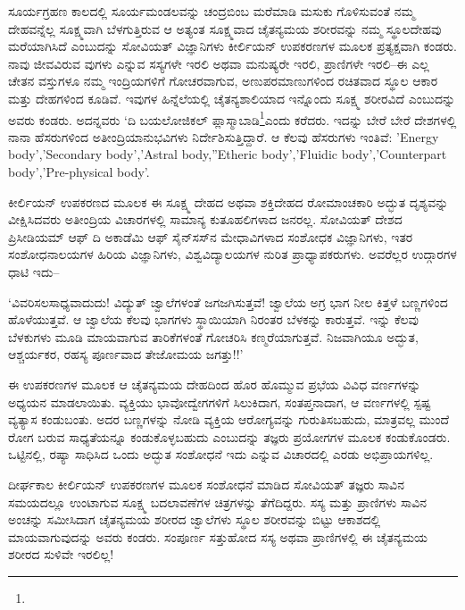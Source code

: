 ಸೂರ್ಯಗ್ರಹಣ ಕಾಲದಲ್ಲಿ ಸೂರ್ಯಮಂಡಲವನ್ನು ಚಂದ್ರಬಿಂಬ ಮರೆಮಾಡಿ ಮಸುಕು ಗೊಳಿಸುವಂತೆ ನಮ್ಮ ದೇಹವನ್ನೆಲ್ಲ ಸೂಕ್ಷ್ಮವಾಗಿ ಬೆಳಗುತ್ತಿರುವ ಆ ಅತ್ಯಂತ ಸೂಕ್ಷ್ಮವಾದ ಚೈತನ್ಯಮಯ ಶರೀರವನ್ನು ನಮ್ಮ ಸ್ಥೂಲದೇಹವು ಮರೆಯಾಗಿಸಿದೆ ಎಂಬುದನ್ನು ಸೋವಿಯತ್ ವಿಜ್ಞಾನಿಗಳು ಕೀರ್ಲಿಯನ್ ಉಪಕರಣಗಳ ಮೂಲಕ ಪ್ರತ್ಯಕ್ಷವಾಗಿ ಕಂಡರು. ನಾವು ಜೀವವಿರುವ ವುಗಳು ಎನ್ನುವ ಸಸ್ಯಗಳೇ ಇರಲಿ ಅಥವಾ ಮನುಷ್ಯರೇ ಇರಲಿ, ಪ್ರಾಣಿಗಳೇ ಇರಲಿ–ಈ ಎಲ್ಲ ಚೇತನ ವಸ್ತುಗಳೂ ನಮ್ಮ ಇಂದ್ರಿಯಗಳಿಗೆ ಗೋಚರವಾಗುವ, ಅಣುಪರಮಾಣುಗಳಿಂದ ರಚಿತವಾದ ಸ್ಥೂಲ ಆಕಾರ ಮತ್ತು ದೇಹಗಳಿಂದ ಕೂಡಿವೆ. ಇವುಗಳ ಹಿನ್ನೆಲೆಯಲ್ಲಿ ಚೈತನ್ಯಶಾಲಿಯಾದ ಇನ್ನೊಂದು ಸೂಕ್ಷ್ಮ ಶರೀರವಿದೆ ಎಂಬುದನ್ನು ಅವರು ಕಂಡರು. ಅದನ್ನವರು ‘ದಿ ಬಯಲೋಜಿಕಲ್ ಪ್ಲಾಸ್ಮಾಬಾಡಿ\footnote{}ಎಂದು ಕರೆದರು. ಇದನ್ನು ಬೇರೆ ಬೇರೆ ದೇಶಗಳಲ್ಲಿ ನಾನಾ ಹೆಸರುಗಳಿಂದ ಅತೀಂದ್ರಿಯಾನುಭವಿಗಳು ನಿರ್ದೇಶಿಸುತ್ತಿದ್ದಾರೆ. ಆ ಕೆಲವು ಹೆಸರುಗಳು ಇಂತಿವೆ: 'Energy body','Secondary body','Astral body,''Etheric body','Fluidic body','Counterpart body','Pre-physical body'.

ಕೀರ್ಲಿಯನ್ ಉಪಕರಣದ ಮೂಲಕ ಈ ಸೂಕ್ಷ್ಮ ದೇಹದ ಅಥವಾ ಶಕ್ತಿದೇಹದ ರೋಮಾಂಚಕಾರಿ ಅದ್ಭುತ ದೃಶ್ಯವನ್ನು ವೀಕ್ಷಿಸಿದವರು ಅತೀಂದ್ರಿಯ ವಿಚಾರಗಳಲ್ಲಿ ಸಾಮಾನ್ಯ ಕುತೂಹಲಿಗಳಾದ ಜನರಲ್ಲ. ಸೋವಿಯತ್ ದೇಶದ ಪ್ರಿಸೀಡಿಯಮ್ ಆಫ್ ದಿ ಅಕಾಡೆಮಿ ಆಫ್ ಸೈನ್​ಸಸ್​ನ ಮೇಧಾವಿಗಳಾದ ಸಂಶೋಧಕ ವಿಜ್ಞಾನಿಗಳು, ಇತರ ಸಂಶೋಧನಾಲಯಗಳ ಹಿರಿಯ ವಿಜ್ಞಾನಿಗಳು, ವಿಶ್ವವಿದ್ಯಾಲಯಗಳ ನುರಿತ ಪ್ರಾಧ್ಯಾಪಕರುಗಳು. ಅವರೆಲ್ಲರ ಉದ್ಗಾರಗಳ ಧಾಟಿ ಇದು–

‘ವಿವರಿಸಲಸಾಧ್ಯವಾದುದು! ವಿದ್ಯುತ್ ಜ್ವಾಲೆಗಳಂತೆ ಜಗಜಗಿಸುತ್ತವೆ! ಜ್ವಾಲೆಯ ಅಗ್ರ ಭಾಗ ನೀಲ ಕಿತ್ತಳೆ ಬಣ್ಣಗಳಿಂದ ಹೊಳೆಯುತ್ತವೆ. ಆ ಜ್ವಾಲೆಯ ಕೆಲವು ಭಾಗಗಳು ಸ್ಥಾಯಿಯಾಗಿ ನಿರಂತರ ಬೆಳಕನ್ನು ಕಾರುತ್ತವೆ. ಇನ್ನು ಕೆಲವು ಬೆಳಕುಗಳು ಮೂಡಿ ಮಾಯವಾಗುವ ತಾರಿಕೆಗಳಂತೆ ಗೋಚರಿಸಿ ಕಣ್ಮರೆಯಾಗುತ್ತವೆ. ನಿಜವಾಗಿಯೂ ಅದ್ಭುತ, ಆಶ್ಚರ್ಯಕರ, ರಹಸ್ಯ ಪೂರ್ಣವಾದ ತೇಜೋಮಯ ಜಗತ್ತು!!’

ಈ ಉಪಕರಣಗಳ ಮೂಲಕ ಆ ಚೈತನ್ಯಮಯ ದೇಹದಿಂದ ಹೊರ ಹೊಮ್ಮುವ ಪ್ರಭೆಯ ವಿವಿಧ ವರ್ಣಗಳನ್ನು ಅಧ್ಯಯನ ಮಾಡಲಾಯಿತು. ವ್ಯಕ್ತಿಯು ಭಾವೋದ್ವೇಗಗಳಿಗೆ ಸಿಲುಕಿದಾಗ, ಸಂತಪ್ತನಾದಾಗ, ಆ ವರ್ಣಗಳಲ್ಲಿ ಸ್ಪಷ್ಟ ವ್ಯತ್ಯಾಸ ಕಂಡುಬಂತು. ಅದರ ಬಣ್ಣಗಳನ್ನು ನೋಡಿ ವ್ಯಕ್ತಿಯ ಆರೋಗ್ಯವನ್ನು ಗುರುತಿಸಬಹುದು, ಮಾತ್ರವಲ್ಲ ಮುಂದೆ ರೋಗ ಬರುವ ಸಾಧ್ಯತೆಯನ್ನೂ ಕಂಡುಕೊಳ್ಳಬಹುದು ಎಂಬುದನ್ನು ತಜ್ಞರು ಪ್ರಯೋಗಗಳ ಮೂಲಕ ಕಂಡುಕೊಂಡರು. ಒಟ್ಟಿನಲ್ಲಿ, ರಷ್ಯಾ ಸಾಧಿಸಿದ ಒಂದು ಅದ್ಭುತ ಸಂಶೋಧನೆ ಇದು ಎನ್ನುವ ವಿಚಾರದಲ್ಲಿ ಎರಡು ಅಭಿಪ್ರಾಯಗಳಿಲ್ಲ.

ದೀರ್ಘಕಾಲ ಕೀರ್ಲಿಯನ್ ಉಪಕರಣಗಳ ಮೂಲಕ ಸಂಶೋಧನೆ ಮಾಡಿದ ಸೋವಿಯತ್ ತಜ್ಞರು ಸಾವಿನ ಸಮಯದಲ್ಲೂ ಉಂಟಾಗುವ ಸೂಕ್ಷ್ಮ ಬದಲಾವಣೆಗಳ ಚಿತ್ರಗಳನ್ನು ತೆಗೆದಿದ್ದರು. ಸಸ್ಯ ಮತ್ತು ಪ್ರಾಣಿಗಳು ಸಾವಿನ ಅಂಚನ್ನು ಸಮೀಸಿದಾಗ ಚೈತನ್ಯಮಯ ಶರೀರದ ಜ್ವಾಲೆಗಳು ಸ್ಥೂಲ ಶರೀರವನ್ನು ಬಿಟ್ಟು ಆಕಾಶದಲ್ಲಿ ಮಾಯವಾಗುವುದನ್ನು ಅವರು ಕಂಡರು. ಸಂಪೂರ್ಣ ಸತ್ತುಹೋದ ಸಸ್ಯ ಅಥವಾ ಪ್ರಾಣಿಗಳಲ್ಲಿ ಈ ಚೈತನ್ಯಮಯ ಶರೀರದ ಸುಳಿವೇ ಇರಲಿಲ್ಲ!

